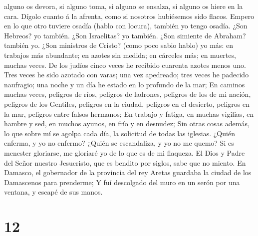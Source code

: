 alguno os devora, si alguno toma, si alguno se ensalza, si alguno os
hiere en la cara.  Dígolo cuanto á la afrenta, como si
nosotros hubiésemos sido flacos. Empero en lo que otro tuviere osadía
(hablo con locura), también yo tengo osadía.  ¿Son Hebreos?
yo también. ¿Son Israelitas? yo también. ¿Son simiente de Abraham?
también yo.  ¿Son ministros de Cristo? (como poco sabio
hablo) yo más: en trabajos más abundante; en azotes sin medida; en
cárceles más; en muertes, muchas veces.  De los judíos
cinco veces he recibido cuarenta azotes menos uno.  Tres
veces he sido azotado con varas; una vez apedreado; tres veces he
padecido naufragio; una noche y un día he estado en lo profundo de la
mar;  En caminos muchas veces, peligros de ríos, peligros
de ladrones, peligros de los de mi nación, peligros de los Gentiles,
peligros en la ciudad, peligros en el desierto, peligros en la mar,
peligros entre falsos hermanos;  En trabajo y fatiga, en
muchas vigilias, en hambre y sed, en muchos ayunos, en frío y en
desnudez;  Sin otras cosas además, lo que sobre mí se
agolpa cada día, la solicitud de todas las iglesias. 
¿Quién enferma, y yo no enfermo? ¿Quién se escandaliza, y yo no me
quemo?  Si es menester gloriarse, me gloriaré yo de lo que
es de mi flaqueza.  El Dios y Padre del Señor nuestro
Jesucristo, que es bendito por siglos, sabe que no miento. 
En Damasco, el gobernador de la provincia del rey Aretas guardaba la
ciudad de los Damascenos para prenderme;  Y fuí descolgado
del muro en un serón por una ventana, y escapé de sus manos.

\hypertarget{section-11}{%
\section{12}\label{section-11}}

